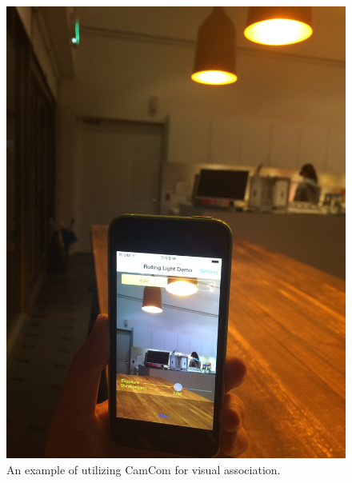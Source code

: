 \begin{figure}[!t]
	\includegraphics[scale=0.075]{pic/scenario.JPG}
	\centering
	\caption{An example of utilizing CamCom for visual association.}
	\label{fig:scenario}
\end{figure}

